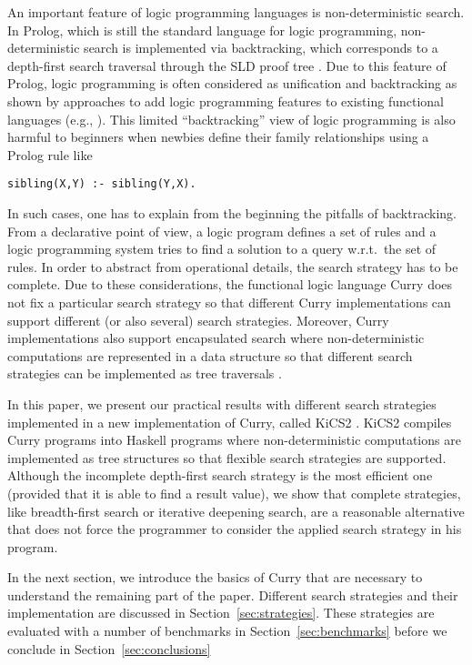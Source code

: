 \documentclass[english]{lni}
\begin{document}
An important feature of logic programming languages
is non-deterministic search.
In Prolog, which is still the standard language for logic programming,
non-deterministic search is implemented via backtracking,
which corresponds to a depth-first search traversal
through the SLD proof tree \cite{Lloyd87}.
Due to this feature of Prolog,
logic programming is often considered as unification and backtracking
as shown by approaches to add logic programming features
to existing functional languages
(e.g., \cite{ClaessenLjungloef00,Hinze01}).
This limited ``backtracking'' view of logic programming
is also harmful to beginners when newbies
define their family relationships using a Prolog rule like
\begin{lstlisting}
sibling(X,Y) :- sibling(Y,X).
\end{lstlisting}
In such cases, one has to explain from the beginning
the pitfalls of backtracking.
From a declarative point of view,
a logic program defines a set of rules
and a logic programming system tries to find
a solution to a query w.r.t.\ the set of rules.
In order to abstract from operational details,
the search strategy has to be complete.
Due to these considerations,
the functional logic language Curry \cite{Hanus06Curry}
does not fix a particular search strategy
so that different Curry implementations can support
different (or also several) search strategies.
Moreover, Curry implementations also
support encapsulated search
where non-deterministic computations are represented
in a data structure so that different search strategies
can be implemented as tree traversals
\cite{BrasselHanusHuch04JFLP,HanusSteiner98PLILP,Lux99FLOPS}.

In this paper, we present our practical results
with different search strategies implemented
in a new implementation of Curry, called
KiCS2 \cite{BrasselHanusPeemoellerReck11}.
KiCS2 compiles Curry programs into Haskell programs
where non-deterministic computations are implemented
as tree structures so that flexible search strategies
are supported.
Although the incomplete depth-first search strategy
is the most efficient one (provided that it is able
to find a result value),
we show that complete strategies,
like breadth-first search or iterative deepening search,
are a reasonable alternative that does not force
the programmer to consider the applied search strategy
in his program.

In the next section, we introduce the basics of Curry
that are necessary to understand the remaining part of the paper.
Different search strategies and their implementation
are discussed in Section~\ref{sec:strategies}.
These strategies are evaluated with a number of benchmarks
in Section~\ref{sec:benchmarks}
before we conclude in Section~\ref{sec:conclusions}
\end{document}
